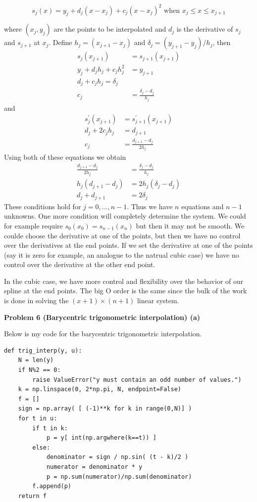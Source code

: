 \documentclass[12pt]{article}
\newcommand{\problem}[1]{\hspace{-4 ex} \large \textbf{Problem #1} }
\begin{document}
$$
s_j(x) = y_j + d_j(x-x_j) + c_j(x-x_j)^2 \text{ when } x_j \leq x \leq x_{j+1}
$$

where $(x_j,y_j)$ are the points to be interpolated and $d_j$ is the derivative of $s_j$ and $s_{j+1}$ at $x_j$. Define $h_j = (x_{j+1}-x_j)$ and $\delta_j = (y_{j+1}-y_j)/h_j$, then
\begin{align*}
	s_j(x_{j+1}) & = s_{j+1}(x_{j+1}) \\
	y_j + d_jh_j + c_jh_j^2 & = y_{j+1} \\
	d_j + c_jh_j = \delta_j \\
	c_j & = \frac{\delta_j - d_j}{h_j}
\end{align*} 
and 
\begin{align*}
	s_j^\prime(x_{j+1}) & = s_{j+1}^\prime(x_{j+1}) \\
	d_j + 2c_jh_j & = d_{j+1} \\
	c_j & = \frac{d_{j+1} - d_j}{2h_j}
\end{align*}
Using both of these equations we obtain
\begin{align*}
	\frac{d_{j+1} - d_j}{2h_j} & = \frac{\delta_j - d_j}{h_j} \\
	h_j(d_{j+1} - d_j) & = 2h_j(\delta_j - d_j) \\
	d_j + d_{j+1} & = 2\delta_j
\end{align*}
These conditions hold for $j=0, ..., n-1$. Thus we have $n$ equations and $n-1$ unknowns. One more condition will completely determine the system. We could for example require $s_0(x_0) = s_{n-1}(x_n)$ but then it may not be smooth. We coulde choose the derivative at one of the points, but then we have no control over the derivatives at the end points. If we set the derivative at one of the points (say it is zero for example, an analogue to the natrual cubic case) we have no control over the derivative at the other end point. \bigbreak

In the cubic case, we have more control and flexibility over the behavior of our spline at the end points. The big O order is the same since the bulk of the work is done in solving the $(x+1)\times(n+1)$ linear system.

\problem{6 (Barycentric trigonometric interpolation) (a)}

	Below is my code for the barycentric trigonometric interpolation.
	
	\begin{lstlisting}
def trig_interp(y, u):
	N = len(y)
	if N%2 == 0:
		raise ValueError("y must contain an odd number of values.")
	k = np.linspace(0, 2*np.pi, N, endpoint=False)
	f = []
	sign = np.array( [ (-1)**k for k in range(0,N)] )
	for t in u:
		if t in k:
			p = y[ int(np.argwhere(k==t)) ]
		else:
			denominator = sign / np.sin( (t - k)/2 )
			numerator = denominator * y
			p = np.sum(numerator)/np.sum(denominator)
		f.append(p)
	return f
	\end{lstlisting}
	
\end{document}
